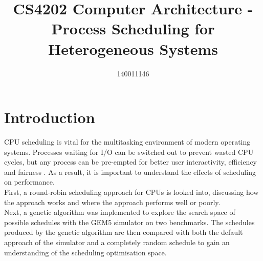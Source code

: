 \documentclass{article}
\title{CS4202 Computer Architecture - Process Scheduling for Heterogeneous Systems}
\author{140011146}
\newcommand{\n}[0]{\\[\baselineskip]}
\begin{document}
\maketitle

\section{Introduction}
CPU scheduling is vital for the multitasking environment of modern operating systems. Processes waiting for I/O can be switched out to prevent wasted CPU cycles, but any process can be pre-empted for better user interactivity, efficiency and fairness \cite{os}. As a result, it is important to understand the effects of scheduling on performance.
\n
First, a round-robin scheduling approach for CPUs is looked into, discussing how the approach works and where the approach performs well or poorly. 
\n
Next, a genetic algorithm was implemented to explore the search space of possible schedules with the GEM5 simulator on two benchmarks. The schedules produced by the genetic algorithm are then compared with both the default approach of the simulator and a completely random schedule to gain an understanding of the scheduling optimisation space.
\end{document}
